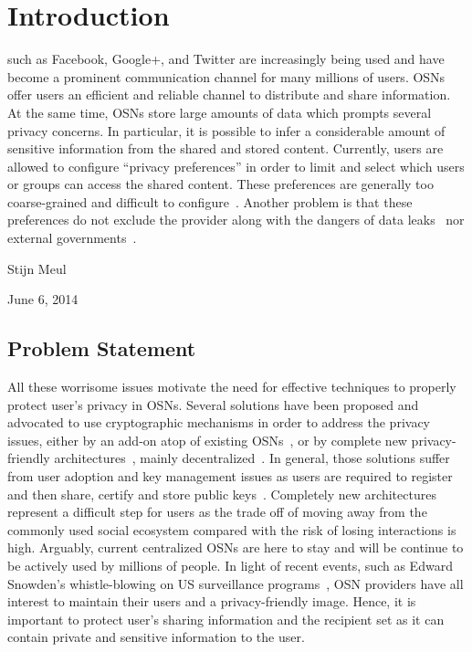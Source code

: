 \documentclass[journal]{IEEEtran}
\begin{document}
\section{Introduction}
% 
% 
% 
% 
 such as Facebook, Google+, and Twitter are increasingly being used and have become a prominent communication channel for many millions of users. OSNs offer users an efficient and reliable channel to distribute and share information. At the same time, OSNs store large amounts of data which prompts several privacy concerns. In particular, it is possible to infer a considerable amount of sensitive information from the shared and stored content. Currently, users are allowed to configure ``privacy preferences'' in order to limit and select which users or groups can access the shared content. These preferences are generally too coarse-grained and difficult to configure~\cite{bonneau2010privacy}. Another problem is that these preferences do not exclude the provider along with the dangers of data leaks~\cite{fischetti11hacker} nor external governments~\cite{prism}. 

\hfill Stijn Meul
 
\hfill June 6, 2014

\subsection{Problem Statement}
All these worrisome issues motivate the need for effective techniques to properly protect user's privacy in OSNs. Several solutions have been proposed and advocated to use cryptographic mechanisms in order to address the privacy issues, either by an add-on atop of existing OSNs~\cite{BadenPersona,BeatoScramble,Guha:2008,Luo:2009}, or by complete new privacy-friendly architectures~\cite{DBLP:conf/sp/CristofaroSTW12}, mainly decentralized~\cite{DBLP:conf/wowmom/CutilloMO11,NYT2010.Diaspora}. In general, those solutions suffer from user adoption and key management issues as users are required to register and then share, certify and store public keys~\cite{article2400}. Completely new architectures represent a difficult step for users as the trade off of moving away from the commonly used social ecosystem compared with the risk of losing interactions is high. Arguably, current centralized OSNs are here to stay and will be continue to be actively used by millions of people. In light of recent events, such as Edward Snowden's whistle-blowing on US surveillance programs~\cite{prism}, OSN providers have all interest to maintain their users and a privacy-friendly image. Hence, it is important to protect user's sharing information and the recipient set as it can contain private and sensitive information to the user. 
\end{document}
